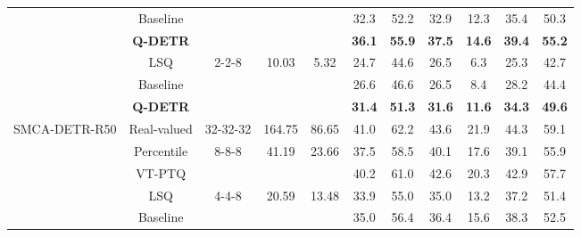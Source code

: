 \documentclass[10pt,twocolumn,letterpaper]{article}
\begin{document}
\begin{table*}[!t]
\begin{tabular}{ccccccccccc}
& Baseline        &                        &                        &                        & 32.3                                                       & 52.2          & 32.9          & 12.3          & 35.4          & 50.3          \\
& \textbf{Q-DETR} &                        &                        &                        & \textbf{36.1}                                              & \textbf{55.9} & \textbf{37.5} & \textbf{14.6} & \textbf{39.4} & \textbf{55.2} \\ \cline{2-11} 
& LSQ             & \multirow{3}{*}{2-2-8} & \multirow{3}{*}{10.03}  & \multirow{3}{*}{5.32}  & 24.7                                                       & 44.6          & 26.5          & 6.3           & 25.3          & 42.7          \\
& Baseline        &                        &                        &                        & 26.6                                                       & 46.6          & 26.5          & 8.4           & 28.2          & 44.4          \\
& \textbf{Q-DETR} &                        &                        &                        & \textbf{31.4}                                              & \textbf{51.3} & \textbf{31.6} & \textbf{11.6} & \textbf{34.3} & \textbf{49.6} \\ \hline
\multirow{12}{*}{SMCA-DETR-R50} & Real-valued     & 32-32-32               & 164.75                 & 86.65                  & 41.0                                                       & 62.2          & 43.6          & 21.9          & 44.3          & 59.1          \\ \cline{2-11} 
& Percentile      & \multirow{2}{*}{8-8-8} & \multirow{2}{*}{41.19} & \multirow{2}{*}{23.66} & 37.5                                                       & 58.5          & 40.1          & 17.6          & 39.1          & 55.9          \\
& VT-PTQ          &                        &                        &                        & 40.2                                                       & 61.0          & 42.6          & 20.3          & 42.9          & 57.7          \\ \cline{2-11} 
& LSQ             & \multirow{3}{*}{4-4-8} & \multirow{3}{*}{20.59} & \multirow{3}{*}{13.48} & 33.9                                                       & 55.0          & 35.0          & 13.2          & 37.2          & 51.4          \\
& Baseline        &                        &                        &                        & 35.0                                                       & 56.4          & 36.4          & 15.6          & 38.3          & 52.5          \\

\end{tabular}
\end{table*}
\end{document}
